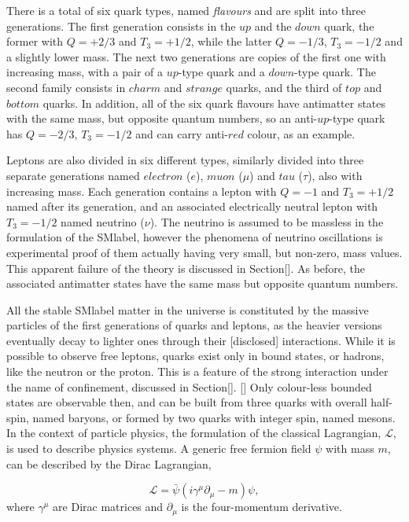 There is a total of six quark types, named \textit{flavours} and are split into three generations. The first generation consists in the $up$ and the $down$ quark, the former with $Q=+2/3$ and $T_3=+1/2$, while the latter $Q=-1/3$, $T_3=-1/2$ and a slightly lower mass. The next two generations are copies of the first one with increasing mass, with a pair of a $up$-type quark and a $down$-type quark. The second family consists in $charm$ and $strange$ quarks, and the third of $top$ and $bottom$ quarks. In addition, all of the six quark flavours have antimatter states with the same mass, but opposite quantum numbers, so an anti-$up$-type quark has $Q=-2/3$, $T_3=-1/2$ and can carry anti-$red$ colour, as an example.

Leptons are also divided in six different types, similarly divided into three separate generations named $electron$ ($e$), $muon$ ($\mu$) and $tau$ ($\tau$), also with increasing mass. Each generation contains a lepton with $Q=-1$ and $T_3=+1/2$ named after its generation, and an associated electrically neutral lepton with $T_3=-1/2$ named neutrino ($\nu$). The neutrino is assumed to be massless in the formulation of the \acrshort{SMlabel}, however the phenomena of neutrino oscillations is experimental proof of them actually having very small, but non-zero, mass values. This apparent failure of the theory is discussed in Section[]. As before, the associated antimatter states have the same mass but opposite quantum numbers.

All the stable \acrshort{SMlabel} matter in the universe is constituted by the massive particles of the first generations of quarks and leptons, as the heavier versions eventually decay to lighter ones through their [disclosed] interactions. While it is possible to observe free leptons, quarks exist only in bound states, or hadrons, like the neutron or the proton. This is a feature of the strong interaction under the name of confinement, discussed in Section[]. [] Only colour-less bounded states are observable then, and can be built from three quarks with overall half-spin, named baryons, or formed by two quarks with integer spin, named mesons.\\

In the context of particle physics, the formulation of the classical Lagrangian, $\mathcal{L}$, is used to describe physics systems. A generic free fermion field $\psi$ with mass $m$, can be described by the Dirac Lagrangian, 

\begin{equation}
\label{Theory_eq:diraceq}
    \mathcal{L} = \bar{\psi}(i\gamma^\mu\partial_\mu-m)\psi,
\end{equation}
where $\gamma^\mu$ are Dirac matrices and $\partial_\mu$ is the four-momentum derivative.

